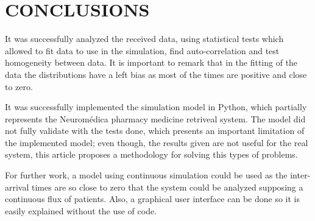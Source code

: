 \section{CONCLUSIONS}
It was successfully analyzed the received data, using statistical tests which allowed to fit data to use in the simulation, find auto-correlation and test homogeneity between data. It is important to remark that in the fitting of the data the distributions have a left bias as most of the times are positive and close to zero.

It was successfully implemented the simulation model in Python, which partially represents the Neuromédica pharmacy medicine retriveal system. The model did not fully validate with the tests done, which presents an important limitation of the implemented model; even though, the results given are not useful for the real system, this article proposes a methodology for solving this types of problems. 

For further work, a model using continuous simulation could be used as the inter-arrival times are so close to zero that the system could be analyzed supposing a continuous flux of patients. Also, a graphical user interface can be done so it is easily explained without the use of code.